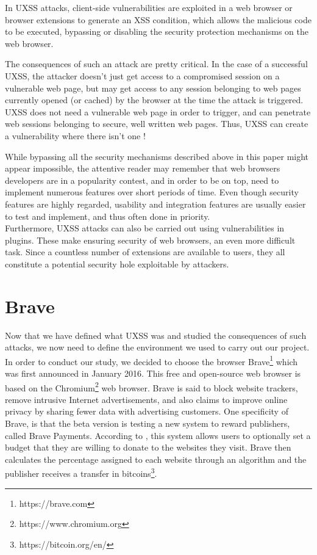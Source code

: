\documentclass[journal]{IEEEtran}
\begin{document}
\bigskip

In UXSS attacks, client-side vulnerabilities are exploited in a web browser or browser extensions to generate an XSS condition, which allows the malicious code to be executed, bypassing or disabling the security protection mechanisms on the web browser.

\medskip

The consequences of such an attack are pretty critical. In the case of a successful UXSS, the attacker doesn’t just get access to a compromised session on a vulnerable web page, but may get access to any session belonging to web pages currently opened (or cached) by the browser at the time the attack is triggered. UXSS does not need a vulnerable web page in order to trigger, and can penetrate web sessions belonging to secure, well written web pages. Thus, UXSS can create a vulnerability where there isn’t one !

\medskip

While bypassing all the security mechanisms described above in this paper might appear impossible, 
the attentive reader may remember that web browsers developers are in a popularity contest, and in order to be on top, need to implement numerous features over short periods of time. Even though security features are highly regarded, usability and integration features are usually easier to test and implement, and thus often done in priority. \\
Furthermore, UXSS attacks can also be carried out using vulnerabilities in plugins. These make ensuring security of web browsers, an even more difficult task. Since a countless number of extensions are available to users, they all constitute a potential security hole exploitable by attackers.


\section{Brave}

Now that we have defined what UXSS was and studied the consequences of such attacks, we now need to define the environment we used to carry out our project. \\
In order to conduct our study, we decided to choose the browser Brave\footnote{https://brave.com} which was first announced in January 2016. This free and open-source web browser is based on the Chromium\footnote{https://www.chromium.org} web browser. Brave is said to block website trackers, remove intrusive Internet advertisements, and also claims to improve online privacy by sharing fewer data with advertising customers. One specificity of Brave, is that the beta version is testing a new system to reward publishers, called Brave Payments. According to \cite{braveWikipedia}, this system allows users to optionally set a budget that they are willing to donate to the websites they visit. Brave then calculates the percentage assigned to each website through an algorithm and the publisher receives a transfer in bitcoins\footnote{https://bitcoin.org/en/}.
\end{document}
